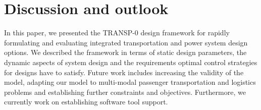 \section{Discussion and outlook}
\label{conclusion}

In this paper, we presented the TRANSP-0 design framework for rapidly formulating and evaluating integrated transportation and power system design options. We described the framework in terms of static design parameters, the dynamic aspects of system design and the requirements optimal control strategies for designs have to satisfy.
Future work includes increasing the validity of the model, adapting our model to multi-modal passenger transportation and logistics problems and establishing further constraints and objectives. Furthermore, we currently work on establishing software tool support.


